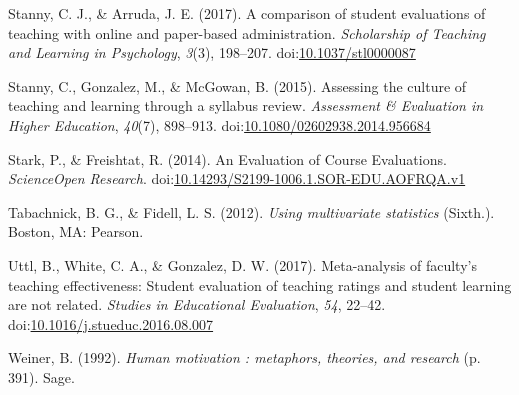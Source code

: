 \documentclass[,man]{apa6}
\theoremstyle{definition}
\theoremstyle{definition}
\theoremstyle{definition}
\theoremstyle{remark}
\begin{document}
\hypertarget{ref-Stanny2017}{}
Stanny, C. J., \& Arruda, J. E. (2017). A comparison of student
evaluations of teaching with online and paper-based administration.
\emph{Scholarship of Teaching and Learning in Psychology}, \emph{3}(3),
198--207.
doi:\href{https://doi.org/10.1037/stl0000087}{10.1037/stl0000087}

\hypertarget{ref-Stanny2015}{}
Stanny, C., Gonzalez, M., \& McGowan, B. (2015). Assessing the culture
of teaching and learning through a syllabus review. \emph{Assessment \&
Evaluation in Higher Education}, \emph{40}(7), 898--913.
doi:\href{https://doi.org/10.1080/02602938.2014.956684}{10.1080/02602938.2014.956684}

\hypertarget{ref-Stark2014}{}
Stark, P., \& Freishtat, R. (2014). An Evaluation of Course Evaluations.
\emph{ScienceOpen Research}.
doi:\href{https://doi.org/10.14293/S2199-1006.1.SOR-EDU.AOFRQA.v1}{10.14293/S2199-1006.1.SOR-EDU.AOFRQA.v1}

\hypertarget{ref-Tabachnick2012}{}
Tabachnick, B. G., \& Fidell, L. S. (2012). \emph{Using multivariate
statistics} (Sixth.). Boston, MA: Pearson.

\hypertarget{ref-Uttl2017}{}
Uttl, B., White, C. A., \& Gonzalez, D. W. (2017). Meta-analysis of
faculty's teaching effectiveness: Student evaluation of teaching ratings
and student learning are not related. \emph{Studies in Educational
Evaluation}, \emph{54}, 22--42.
doi:\href{https://doi.org/10.1016/j.stueduc.2016.08.007}{10.1016/j.stueduc.2016.08.007}

\hypertarget{ref-Weiner1992}{}
Weiner, B. (1992). \emph{Human motivation : metaphors, theories, and
research} (p. 391). Sage.
\end{document}

